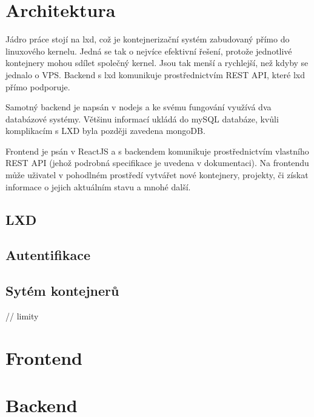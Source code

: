 \documentclass[a4paper,oneside,12pt]{report}
\begin{document}


\tableofcontents


\newpage



\setcounter{page}{1}

\chapter{Architektura}

Jádro práce stojí na lxd, což je kontejnerizační systém zabudovaný přímo do linuxového kernelu.
Jedná se tak o nejvíce efektivní řešení, protože jednotlivé kontejnery mohou sdílet společný kernel.
Jsou tak menší a rychlejší, než kdyby se jednalo o VPS.
Backend s lxd komunikuje prostřednictvím REST API, které lxd přímo podporuje.

Samotný backend je napsán v nodejs a ke svému fungování využívá dva databázové systémy.
Většinu informací ukládá do mySQL databáze, kvůli komplikacím s LXD byla později zavedena mongoDB.

Frontend je psán v ReactJS a s backendem komunikuje prostřednictvím vlastního REST API (jehož podrobná specifikace je uvedena v dokumentaci).
Na frontendu může uživatel v pohodlném prostředí vytvářet nové kontejnery, projekty, či získat informace o jejich aktuálním stavu a mnohé další.


\section{LXD}

\section{Autentifikace}


\section{Sytém kontejnerů}

// limity

\chapter{Frontend}

\chapter{Backend}
\end{document}
